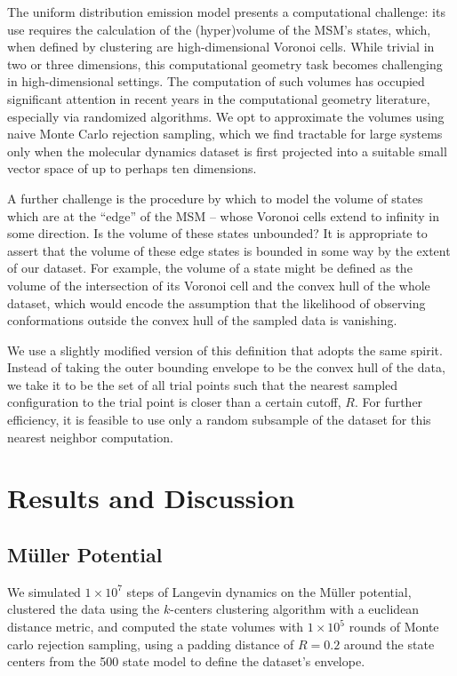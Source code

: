 \documentclass[twocolumn,floatfix,nofootinbib,aps]{revtex4-1}
\begin{document}
The uniform distribution emission model presents a computational challenge: its use requires the calculation of the (hyper)volume of the MSM's states, which, when defined by clustering are high-dimensional Voronoi cells. While trivial in two or three dimensions, this computational geometry task becomes challenging in high-dimensional settings. The computation of such volumes has occupied significant attention in recent years in the computational geometry literature, especially via randomized algorithms\cite{Kannan97, Simonovits03, Lovasz03}. We opt to approximate the volumes using naive Monte Carlo rejection sampling, which we find tractable for large systems only when the molecular dynamics dataset is first projected into a suitable small vector space of up to perhaps ten dimensions.

A further challenge is the procedure by which to model the volume of states which are at the ``edge'' of the MSM -- whose Voronoi cells extend to infinity in some direction. Is the volume of these states unbounded? It is appropriate to assert that the volume of these edge states is bounded in some way by the extent of our dataset. For example, the volume of a state might be defined as the volume of the intersection of its Voronoi cell and the convex hull of the whole dataset, which would encode the assumption that the likelihood of observing conformations outside the convex hull of the sampled data is vanishing.

We use a slightly modified version of this definition that adopts the same spirit. Instead of taking the outer bounding envelope to be the convex hull of the data, we take it to be the set of all trial points such that the nearest sampled configuration to the trial point is closer than a certain cutoff, $R$. For further efficiency, it is feasible to use only a random subsample of the dataset for this nearest neighbor computation.

\section{Results and Discussion}
\subsection{M\"{u}ller Potential}
We simulated $1\times 10^7$ steps of Langevin dynamics on the M\"{u}ller potential, clustered the data using the $k$-centers clustering algorithm with a euclidean distance metric, and computed the state volumes with $1\times 10^5$ rounds of Monte carlo rejection sampling, using a padding distance of $R=0.2$ around the state centers from the 500 state model to define the dataset's envelope.
\end{document}
